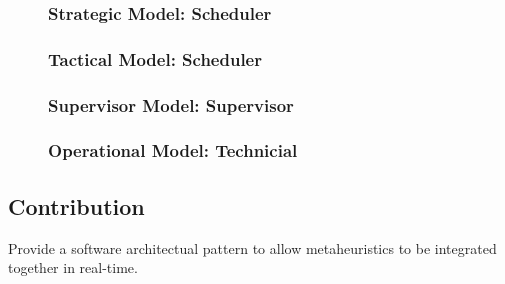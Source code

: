 \newpage
\begin{figure}[H]
\subsubsection{Strategic Model: Scheduler}

\strategicModel[clustering=true, beta=false, normal=false, multiskill=true]
\end{figure}

\begin{figure}[H]
\subsubsection{Tactical Model: Scheduler}

\tacticalModel[]
\end{figure}
\begin{figure}[H]
\subsubsection{Supervisor Model: Supervisor}

\supervisorModel[]
\end{figure}


\begin{figure}[H]
\subsubsection{Operational Model: Technicial}

\operationalModel[]
\end{figure}


\subsection{Contribution}
Provide a software architectual pattern to allow metaheuristics to be integrated together in real-time.
